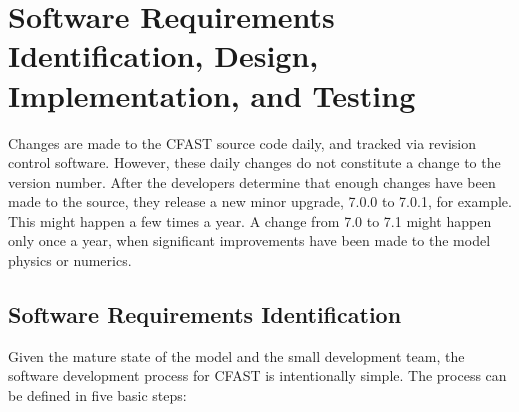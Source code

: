 \documentclass[12pt]{book}
\begin{document}
\chapter{Software Requirements Identification, Design, Implementation, and Testing}

Changes are made to the CFAST source code daily, and tracked via revision control software. However, these daily changes do not constitute a change to the version number. After the developers determine that enough changes have been made to the source, they release a new minor upgrade, 7.0.0 to 7.0.1, for example. This might happen a few times a year. A change from 7.0 to 7.1 might happen only once a year, when significant improvements have been made to the model physics or numerics.

\section{Software Requirements Identification}

Given the mature state of the model and the small development team, the software development process for CFAST is intentionally simple. The process can be defined in five basic steps:
\end{document}
